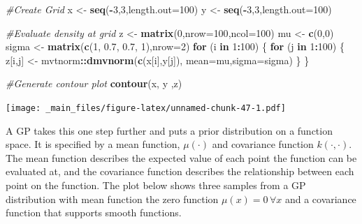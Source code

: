 \documentclass[
]{book}
\newenvironment{Shaded}{\begin{snugshade}}{\end{snugshade}}
\newcommand{\AttributeTok}[1]{\textcolor[rgb]{0.13,0.29,0.53}{#1}}
\newcommand{\CommentTok}[1]{\textcolor[rgb]{0.56,0.35,0.01}{\textit{#1}}}
\newcommand{\ControlFlowTok}[1]{\textcolor[rgb]{0.13,0.29,0.53}{\textbf{#1}}}
\newcommand{\DecValTok}[1]{\textcolor[rgb]{0.00,0.00,0.81}{#1}}
\newcommand{\FloatTok}[1]{\textcolor[rgb]{0.00,0.00,0.81}{#1}}
\newcommand{\FunctionTok}[1]{\textcolor[rgb]{0.13,0.29,0.53}{\textbf{#1}}}
\newcommand{\NormalTok}[1]{#1}
\newcommand{\OtherTok}[1]{\textcolor[rgb]{0.56,0.35,0.01}{#1}}
\newcommand{\SpecialCharTok}[1]{\textcolor[rgb]{0.81,0.36,0.00}{\textbf{#1}}}
\theoremstyle{definition}
\theoremstyle{definition}
\theoremstyle{definition}
\theoremstyle{definition}
\theoremstyle{remark}
\begin{document}
\begin{Shaded}
\begin{Highlighting}[]
\CommentTok{\#Create Grid}
\NormalTok{x }\OtherTok{\textless{}{-}} \FunctionTok{seq}\NormalTok{(}\SpecialCharTok{{-}}\DecValTok{3}\NormalTok{,}\DecValTok{3}\NormalTok{,}\AttributeTok{length.out=}\DecValTok{100}\NormalTok{)}
\NormalTok{y }\OtherTok{\textless{}{-}} \FunctionTok{seq}\NormalTok{(}\SpecialCharTok{{-}}\DecValTok{3}\NormalTok{,}\DecValTok{3}\NormalTok{,}\AttributeTok{length.out=}\DecValTok{100}\NormalTok{)}

\CommentTok{\#Evaluate density at grid}
\NormalTok{z }\OtherTok{\textless{}{-}} \FunctionTok{matrix}\NormalTok{(}\DecValTok{0}\NormalTok{,}\AttributeTok{nrow=}\DecValTok{100}\NormalTok{,}\AttributeTok{ncol=}\DecValTok{100}\NormalTok{)}
\NormalTok{mu }\OtherTok{\textless{}{-}} \FunctionTok{c}\NormalTok{(}\DecValTok{0}\NormalTok{,}\DecValTok{0}\NormalTok{)}
\NormalTok{sigma }\OtherTok{\textless{}{-}} \FunctionTok{matrix}\NormalTok{(}\FunctionTok{c}\NormalTok{(}\DecValTok{1}\NormalTok{, }\FloatTok{0.7}\NormalTok{, }\FloatTok{0.7}\NormalTok{, }\DecValTok{1}\NormalTok{),}\AttributeTok{nrow=}\DecValTok{2}\NormalTok{)}
\ControlFlowTok{for}\NormalTok{ (i }\ControlFlowTok{in} \DecValTok{1}\SpecialCharTok{:}\DecValTok{100}\NormalTok{) \{}
  \ControlFlowTok{for}\NormalTok{ (j }\ControlFlowTok{in} \DecValTok{1}\SpecialCharTok{:}\DecValTok{100}\NormalTok{) \{}
\NormalTok{    z[i,j] }\OtherTok{\textless{}{-}}\NormalTok{ mvtnorm}\SpecialCharTok{::}\FunctionTok{dmvnorm}\NormalTok{(}\FunctionTok{c}\NormalTok{(x[i],y[j]),}
                      \AttributeTok{mean=}\NormalTok{mu,}\AttributeTok{sigma=}\NormalTok{sigma)}
\NormalTok{  \}}
\NormalTok{\}}

\CommentTok{\#Generate contour plot}
\FunctionTok{contour}\NormalTok{(x, y ,z)}
\end{Highlighting}
\end{Shaded}

\texttt{[image: \_main\_files/figure-latex/unnamed-chunk-47-1.pdf]}

A GP takes this one step further and puts a prior distribution on a function space. It is specified by a mean function, \(\mu(\cdot)\) and covariance function \(k(\cdot, \cdot)\). The mean function describes the expected value of each point the function can be evaluated at, and the covariance function describes the relationship between each point on the function. The plot below shows three samples from a GP distribution with mean function the zero function \(\mu(x) = 0\, \forall x\) and a covariance function that supports smooth functions.
\end{document}
